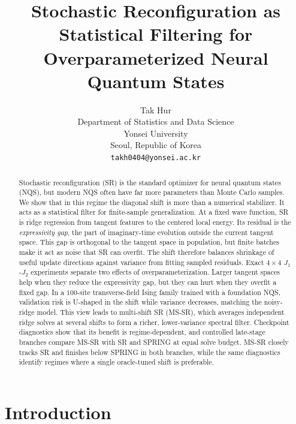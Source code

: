 \documentclass{article}
\title{Stochastic Reconfiguration as Statistical Filtering for Overparameterized Neural Quantum States}
\author{%
  Tak Hur \\
  Department of Statistics and Data Science \\
  Yonsei University \\
  Seoul, Republic of Korea \\
  \texttt{takh0404@yonsei.ac.kr} \\
}
\begin{document}
\maketitle

\begin{abstract}
Stochastic reconfiguration (SR) is the standard optimizer for neural quantum
states (NQS), but modern NQS often have far more parameters than Monte Carlo
samples. We show that in this regime the diagonal shift is more than a numerical
stabilizer. It acts as a statistical filter for finite-sample generalization.
At a fixed wave function, SR is ridge regression from tangent features to the
centered local energy. Its residual is the \emph{expressivity gap}, the part of
imaginary-time evolution outside the current tangent space. This gap is
orthogonal to the tangent space in population, but finite batches make it act as
noise that SR can overfit. The shift therefore balances shrinkage of useful
update directions against variance from fitting sampled residuals.
Exact $4\times4$ $J_1$-$J_2$ experiments separate two effects of
overparameterization. Larger tangent spaces help when they reduce the
expressivity gap, but they can hurt when they overfit a fixed gap. In a $100$-site
transverse-field Ising family trained with a foundation NQS, validation risk is
U-shaped in the shift while variance decreases, matching the noisy-ridge model.
This view leads to multi-shift SR (MS-SR), which averages independent ridge
solves at several shifts to form a richer, lower-variance spectral filter.
Checkpoint diagnostics show that its benefit is regime-dependent, and controlled
late-stage branches compare MS-SR with SR and SPRING at equal solve budget.
MS-SR closely tracks SR and finishes below SPRING in both branches, while the
same diagnostics identify regimes where a single oracle-tuned shift is preferable.
\end{abstract}

\section{Introduction}
\end{document}
